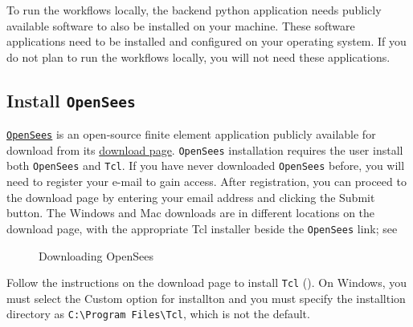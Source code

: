 To run the workflows locally, the backend python application needs
publicly available software to also be installed on your
machine. These software applications need to be installed and
configured on your operating system. If you do not plan to run the
workflows locally, you will not need these applications.


\subsection{Install \texttt{OpenSees}}

\href{http://opensees.berkeley.edu}{\texttt{OpenSees}} is an open-source finite element application publicly available for download from its \href{http://opensees.berkeley.edu/OpenSees/user/download.php}{download page}. \texttt{OpenSees} installation requires the user install both \texttt{OpenSees} and \texttt{Tcl}.  If you have never downloaded \texttt{OpenSees} before, you will need to register your e-mail to gain access. After registration, you can proceed to the download page by entering your email address and clicking the Submit button. The Windows and Mac downloads are in different locations on the download page, with the appropriate Tcl installer beside the \texttt{OpenSees} link; see 

\begin{figure}[!htbp]
  \caption{Downloading OpenSees}
  \label{fig:openseesDownload}
\end{figure}

Follow the instructions on the download page to install \texttt{Tcl}
(). On Windows, you must select the Custom option for installton and you must specify
the installtion directory as \texttt{C:\textbackslash Program Files\textbackslash Tcl}, 
which is not the default. \\

